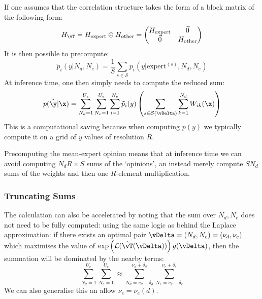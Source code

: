             If one assumes that the correlation structure takes the form of a block matrix of the following form:
            \begin{equation}
                H_\vT = H_{\text{expert}} \oplus H_{\text{other}} = \begin{pmatrix}
                    H_{\text{expert}} & \vec{0} \\ \vec{0} & H_{\text{other}}
                \end{pmatrix}
            \end{equation}
            It is then possible to precompute:
            \begin{equation}
                \tilde{p}_i(y | N_d, N_e) = \frac{1}{S} \sum_{s \in \mathcal{S}} p_i(y | \text{expert}^{(s)},N_d,N_e) 
            \end{equation}
            At inference time, one then simply needs to compute the reduced sum:
            \begin{equation}
                p(\hat{\y}| \x) = \sum_{N_d=1}^{U_s} \sum_{N_e=1}^{U_e}  \sum_{i=1}^{N_e} \tilde{p}_i(y) \left( \sum_{s \in \mathcal{S}(\vDelta)} \sum_{k=1}^{N_d} W_{ik}(\x)\right)
            \end{equation}
            This is a computational saving because when computing $p(y)$ we typically compute it on a grid of $y$ values of resolution $R$. 

            Precomputing the mean-expert opinion means that at inference time we can avoid computing $N_d R\times S$ sums of the `opinions', an instead merely compute $S N_d$ sums of the weights and then one $R$-element multiplication.   
        \subsubsection{Truncating Sums}
           

        The calculation can also be accelerated by noting that the sum over $N_d, N_e$ does not need to be fully computed: using the same logic as behind the Laplace approximation: if there exists an optimal pair $\vDelta = (N_d, N_e) = (\nu_d, \nu_e)$ which maximises the value of $\exp\left(\mathcal{L}(\hat{\vT}(\vDelta))\right) g(\vDelta) $, then the summation will be dominated by the nearby terms:
        \begin{equation}
            \sum_{N_d=1}^{U_e} \sum_{N_e= 1}^{U_e} \approx \sum_{N_d = \nu_d - \delta_d}^{\nu_d + \delta_d} \sum_{N_e = \nu_e - \delta_e}^{\nu_e + \delta_e} 
        \end{equation}
        We can also generalise this an allow $\nu_e = \nu_e(d)$. 

